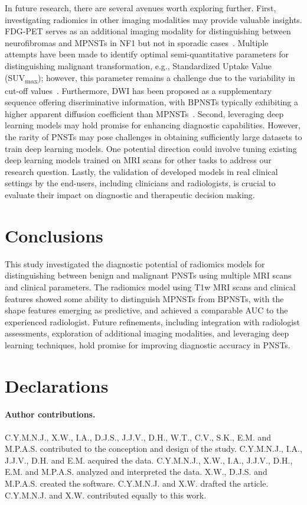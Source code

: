 In future research, there are several avenues worth exploring further.
First, investigating radiomics in other imaging modalities may provide valuable insights.
FDG-PET serves as an additional imaging modality for distinguishing between neurofibromas and MPNSTs in NF1 but not in sporadic cases~\autocite{derlin2013,benz2010,schwabe2019,salamon2013}.
Multiple attempts have been made to identify optimal semi-quantitative parameters for distinguishing malignant transformation, e.g., Standardized Uptake Value (SUV\textsubscript{max}); however, this parameter remains a challenge due to the variability in cut-off values~\autocite{tovmassian2016}.
Furthermore, DWI has been proposed as a supplementary sequence offering discriminative information, with BPNSTs typically exhibiting a higher apparent diffusion coefficient than MPNSTs~\autocite{benz2010,ahlawat2019,mazal2019}.
Second, leveraging deep learning models may hold promise for enhancing diagnostic capabilities.
However, the rarity of PNSTs may pose challenges in obtaining sufficiently large datasets to train deep learning models.
One potential direction could involve tuning existing deep learning models trained on MRI scans for other tasks to address our research question.
Lastly, the validation of developed models in real clinical settings by the end-users, including clinicians and radiologists, is crucial to evaluate their impact on diagnostic and therapeutic decision making.

\section{Conclusions}
This study investigated the diagnostic potential of radiomics models for distinguishing between benign and malignant PNSTs using multiple MRI scans and clinical parameters.
The radiomics model using T1w MRI scans and clinical features showed some ability to distinguish MPNSTs from BPNSTs, with the shape features emerging as predictive, and achieved a comparable AUC to the experienced radiologist.
Future refinements, including integration with radiologist assessments, exploration of additional imaging modalities, and leveraging deep learning techniques, hold promise for improving diagnostic accuracy in PNSTs.

\section*{Declarations}
\paragraph{Author contributions.}
C.Y.M.N.J., X.W., I.A., D.J.S., J.J.V., D.H., W.T., C.V., S.K., E.M. and M.P.A.S. contributed to the conception and design of the study.
C.Y.M.N.J., I.A., J.J.V., D.H. and E.M. acquired the data.
C.Y.M.N.J., X.W., I.A., J.J.V., D.H., E.M. and M.P.A.S. analyzed and interpreted the data.
X.W., D.J.S. and M.P.A.S. created the software.
C.Y.M.N.J. and X.W. drafted the article.
C.Y.M.N.J. and X.W. contributed equally to this work.

